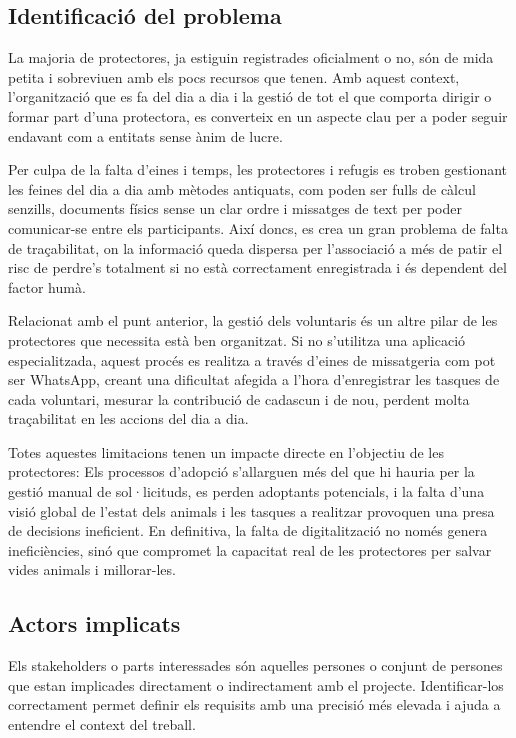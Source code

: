 \documentclass[11pt,a4paper]{report}
\begin{document}
\subsection{Identificació del problema}
La majoria de protectores, ja estiguin registrades oficialment o no, són de mida petita i sobreviuen amb els pocs recursos que tenen. Amb aquest context, l’organització que es fa del dia a dia i la gestió de tot el que comporta dirigir o formar part d’una protectora, es converteix en un aspecte clau per a poder seguir endavant com a entitats sense ànim de lucre. 

Per culpa de la falta d’eines i temps, les protectores i refugis es troben gestionant les feines del dia a dia amb mètodes antiquats, com poden ser fulls de càlcul senzills, documents físics sense un clar ordre i missatges de text per poder comunicar-se entre els participants. Així doncs, es crea un gran problema de falta de traçabilitat, on la informació queda dispersa per l’associació a més de patir el risc de perdre’s totalment si no està correctament enregistrada i és dependent del factor humà.

Relacionat amb el punt anterior, la gestió dels voluntaris és un altre pilar de les protectores que necessita està ben organitzat. Si no s’utilitza una aplicació especialitzada, aquest procés es realitza a través d'eines de missatgeria com pot ser WhatsApp, creant una dificultat afegida a l’hora d'enregistrar les tasques de cada voluntari, mesurar la contribució de cadascun i de nou, perdent molta traçabilitat en les accions del dia a dia.

Totes aquestes limitacions tenen un impacte directe en l’objectiu de les protectores: Els processos d’adopció s’allarguen més del que hi hauria per la gestió manual de sol·licituds, es perden adoptants potencials, i la falta d’una visió global de l’estat dels animals i les tasques a realitzar provoquen una presa de decisions ineficient. En definitiva, la falta de digitalització no només genera ineficiències, sinó que compromet la capacitat real de les protectores per salvar vides animals i millorar-les.


\subsection{Actors implicats}

Els stakeholders o parts interessades són aquelles persones o conjunt de persones que estan implicades directament o indirectament amb el projecte. Identificar-los correctament permet definir els requisits amb una precisió més elevada i ajuda a entendre el context del treball.
\end{document}
